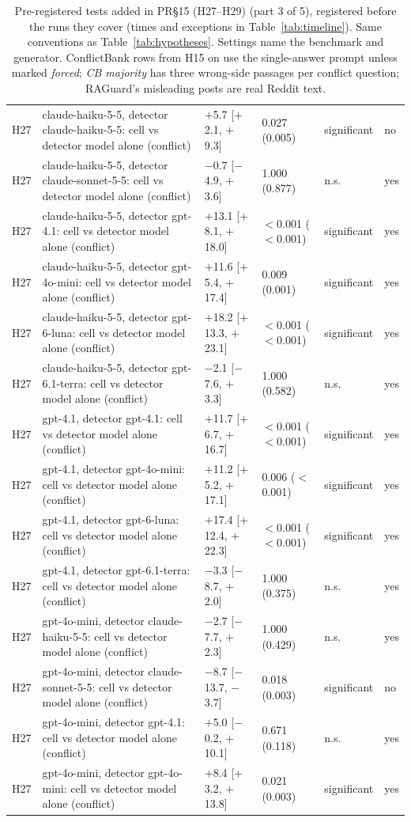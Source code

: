 \begin{table}[p]
{\begin{tabular}{lp{6.6cm}llll}
H27 & claude-haiku-5-5, detector claude-haiku-5-5: cell vs detector model alone (conflict) & $+$5.7 [$+$2.1, $+$9.3] & 0.027 (0.005) & significant & no \\
H27 & claude-haiku-5-5, detector claude-sonnet-5-5: cell vs detector model alone (conflict) & $-$0.7 [$-$4.9, $+$3.6] & 1.000 (0.877) & n.s. & yes \\
H27 & claude-haiku-5-5, detector gpt-4.1: cell vs detector model alone (conflict) & $+$13.1 [$+$8.1, $+$18.0] & $<$0.001 ($<$0.001) & significant & yes \\
H27 & claude-haiku-5-5, detector gpt-4o-mini: cell vs detector model alone (conflict) & $+$11.6 [$+$5.4, $+$17.4] & 0.009 (0.001) & significant & yes \\
H27 & claude-haiku-5-5, detector gpt-6-luna: cell vs detector model alone (conflict) & $+$18.2 [$+$13.3, $+$23.1] & $<$0.001 ($<$0.001) & significant & yes \\
H27 & claude-haiku-5-5, detector gpt-6.1-terra: cell vs detector model alone (conflict) & $-$2.1 [$-$7.6, $+$3.3] & 1.000 (0.582) & n.s. & yes \\
H27 & gpt-4.1, detector gpt-4.1: cell vs detector model alone (conflict) & $+$11.7 [$+$6.7, $+$16.7] & $<$0.001 ($<$0.001) & significant & yes \\
H27 & gpt-4.1, detector gpt-4o-mini: cell vs detector model alone (conflict) & $+$11.2 [$+$5.2, $+$17.1] & 0.006 ($<$0.001) & significant & yes \\
H27 & gpt-4.1, detector gpt-6-luna: cell vs detector model alone (conflict) & $+$17.4 [$+$12.4, $+$22.3] & $<$0.001 ($<$0.001) & significant & yes \\
H27 & gpt-4.1, detector gpt-6.1-terra: cell vs detector model alone (conflict) & $-$3.3 [$-$8.7, $+$2.0] & 1.000 (0.375) & n.s. & yes \\
H27 & gpt-4o-mini, detector claude-haiku-5-5: cell vs detector model alone (conflict) & $-$2.7 [$-$7.7, $+$2.3] & 1.000 (0.429) & n.s. & yes \\
H27 & gpt-4o-mini, detector claude-sonnet-5-5: cell vs detector model alone (conflict) & $-$8.7 [$-$13.7, $-$3.7] & 0.018 (0.003) & significant & no \\
H27 & gpt-4o-mini, detector gpt-4.1: cell vs detector model alone (conflict) & $+$5.0 [$-$0.2, $+$10.1] & 0.671 (0.118) & n.s. & yes \\
H27 & gpt-4o-mini, detector gpt-4o-mini: cell vs detector model alone (conflict) & $+$8.4 [$+$3.2, $+$13.8] & 0.021 (0.003) & significant & yes \\
\bottomrule
\end{tabular}}
\caption{Pre-registered tests added in PR\S15 (H27--H29) (part 3 of 5), registered before the runs they cover (times and exceptions in
Table~\ref{tab:timeline}). Same conventions as
Table~\ref{tab:hypotheses}. Settings name the benchmark and generator. ConflictBank rows from H15 on use the
single-answer prompt unless marked \emph{forced}; \emph{CB majority} has three wrong-side passages per conflict
question; RAGuard's misleading posts are real Reddit text.}
\label{tab:hypotheses13}
\end{table}

